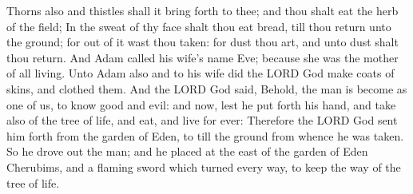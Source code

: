 \begin{biblechapter}
\verse Thorns also and thistles shall it bring forth to thee; and thou shalt eat the herb of the field;
\verse In the sweat of thy face shalt thou eat bread, till thou return unto the ground; for out of it wast thou taken: for dust thou art, and unto dust shalt thou return.
\verse And Adam called his wife's name Eve; because she was the mother of all living.
\verse Unto Adam also and to his wife did the LORD God make coats of skins, and clothed them.
\verse And the LORD God said, Behold, the man is become as one of us, to know good and evil: and now, lest he put forth his hand, and take also of the tree of life, and eat, and live for ever:
\verse Therefore the LORD God sent him forth from the garden of Eden, to till the ground from whence he was taken.
\verse So he drove out the man; and he placed at the east of the garden of Eden Cherubims, and a flaming sword which turned every way, to keep the way of the tree of life.
\end{biblechapter}

